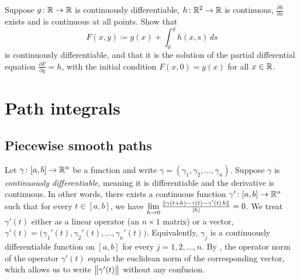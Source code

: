 \begin{exercise}
Suppose $g \colon {\mathbb{R}} \to {\mathbb{R}}$ is continuously differentiable,
$h \colon {\mathbb{R}}^2 \to {\mathbb{R}}$ is continuous,
$\frac{\partial h}{\partial x}$ exists and is continuous at all points.  Show that
\begin{equation*}
F(x,y) \coloneqq g(x) + \int_0^y h(x,s) \,ds
\end{equation*}
is continuously differentiable, and that it is the solution of 
the partial differential equation $\frac{\partial F}{\partial y} = h$,
with the initial condition $F(x,0) = g(x)$ for all $x \in {\mathbb{R}}$.
\end{exercise}


\sectionnewpage
\section{Path integrals}
\label{sec:pathintegral}



\subsection{Piecewise smooth paths}

Let $\gamma \colon [a,b] \to {\mathbb{R}}^n$ be a function and write
$\gamma = (\gamma_1,\gamma_2,\ldots,\gamma_n)$. 
Suppose $\gamma$ is 
\emph{continuously differentiable},
meaning
it is differentiable and the derivative is continuous.
In other words, there exists a continuous function $\gamma' \colon [a,b]
\to {\mathbb{R}}^n$ such that for every $t \in [a,b]$, we have
$\lim\limits_{h \to 0}
\frac{\lVert {\gamma(t+h)-\gamma(t) - \gamma'(t) \, h} \rVert}{\lvert {h} \rvert} = 0$.
We treat
$\gamma'(t)$ either as a linear operator (an $n \times 1$ matrix) or
a vector,
$\gamma'(t) =
\bigl( \gamma_1'(t), \gamma_2'(t), \ldots, \gamma_n'(t) \bigr)$.
Equivalently, 
$\gamma_j$ is a continuously differentiable function on $[a,b]$
for every $j=1,2,\ldots,n$.
By , the operator norm of
the operator $\gamma'(t)$ equals
the euclidean norm of the corresponding vector, which allows us to write 
$\bigl\lVert {\gamma'(t)} \bigr\rVert$ without any confusion.

